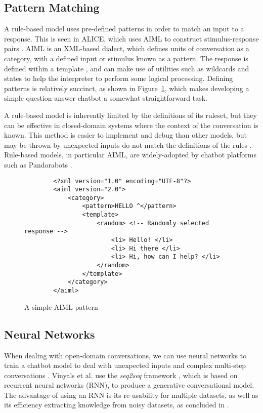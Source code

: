 \subsection{Pattern Matching}
A rule-based model uses pre-defined patterns in order to match an input to a response. This is seen in ALICE, which uses AIML to construct stimulus-response pairs \cite{wallace2009anatomy}. AIML is an XML-based dialect, which defines units of conversation as a category, with a defined input or stimulus known as a pattern. The response is defined within a template \cite{wallace2009anatomy}, and can make use of utilities such as wildcards and states to help the interpreter to perform some logical processing. Defining patterns is relatively succinct, as shown in Figure~\ref{fig:aiml}, which makes developing a simple question-answer chatbot a somewhat straightforward task.

A rule-based model is inherently limited by the definitions of its ruleset, but they can be effective in closed-domain systems where the context of the conversation is known. This method is easier to implement and debug than other models, but may be thrown by unexpected inputs do not match the definitions of the rules \cite{cahn2017chatbot}. Rule-based models, in particular AIML, are widely-adopted by chatbot platforms such as Pandorabots \cite{pandorabots2019about}.

\begin{figure}[h]
	\begin{lstlisting}
		<?xml version="1.0" encoding="UTF-8"?>
		<aiml version="2.0">
			<category>
				<pattern>HELLO ^</pattern>
				<template>
					<random> <!-- Randomly selected response -->
						<li> Hello! </li>
						<li> Hi there </li>
						<li> Hi, how can I help? </li>
					</random>
				</template>
			</category>
		</aiml>
	\end{lstlisting}
	\caption{A simple AIML pattern}
	\label{fig:aiml}
\end{figure}

\subsection{Neural Networks}
When dealing with open-domain conversations, we can use neural networks to train a chatbot model to deal with unexpected inputs and complex multi-step conversations \cite{vinyals2015neural}. Vinyals et al. use the {\it seq2seq} framework \cite{sutskever2014sequence}, which is based on recurrent neural networks (RNN), to produce a generative conversational model. The advantage of using an RNN is its re-usability for multiple datasets, as well as its efficiency extracting knowledge from noisy datasets, as concluded in \cite{vinyals2015neural}.

